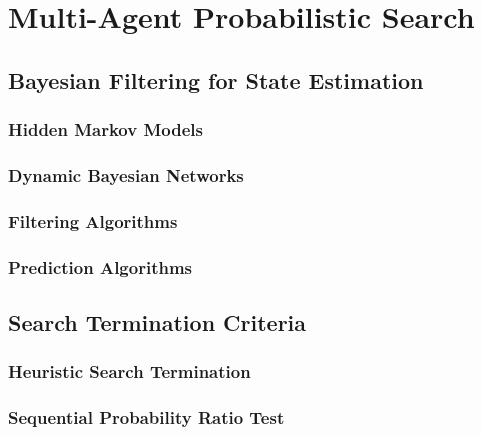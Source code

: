 \chapter{Multi-Agent Probabilistic Search}
\placeholder{}

\section{Bayesian Filtering for State Estimation}

\subsection{Hidden Markov Models}


\subsection{Dynamic Bayesian Networks}


\subsection{Filtering Algorithms}


\subsection{Prediction Algorithms}




\section{Search Termination Criteria}

\subsection{Heuristic Search Termination}
\subsection{Sequential Probability Ratio Test}

